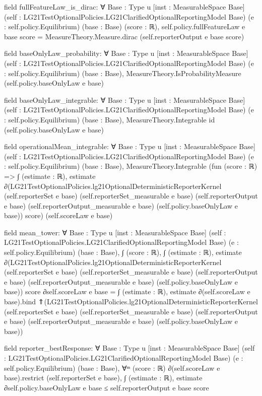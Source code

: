 \documentclass[10pt]{article}
\begin{document}
\begin{ReviewVerbatim}
field fullFeatureLaw_is_dirac:
∀ {Base : Type u} [inst : MeasurableSpace Base]
  (self : LG21TestOptionalPolicies.LG21ClarifiedOptionalReportingModel Base) (e : self.policy.Equilibrium) (base : Base)
  (score : ℝ), self.policy.fullFeatureLaw e base score = MeasureTheory.Measure.dirac (self.reporterOutput e base score)

field baseOnlyLaw_probability:
∀ {Base : Type u} [inst : MeasurableSpace Base]
  (self : LG21TestOptionalPolicies.LG21ClarifiedOptionalReportingModel Base) (e : self.policy.Equilibrium)
  (base : Base), MeasureTheory.IsProbabilityMeasure (self.policy.baseOnlyLaw e base)

field baseOnlyLaw_integrable:
∀ {Base : Type u} [inst : MeasurableSpace Base]
  (self : LG21TestOptionalPolicies.LG21ClarifiedOptionalReportingModel Base) (e : self.policy.Equilibrium)
  (base : Base), MeasureTheory.Integrable id (self.policy.baseOnlyLaw e base)

field operationalMean_integrable:
∀ {Base : Type u} [inst : MeasurableSpace Base]
  (self : LG21TestOptionalPolicies.LG21ClarifiedOptionalReportingModel Base) (e : self.policy.Equilibrium)
  (base : Base),
  MeasureTheory.Integrable
    (fun (score : ℝ) =>
      ∫ (estimate : ℝ),
        estimate ∂(LG21TestOptionalPolicies.lg21OptionalDeterministicReporterKernel (self.reporterSet e base)
            (self.reporterSet_measurable e base) (self.reporterOutput e base) (self.reporterOutput_measurable e base)
            (self.policy.baseOnlyLaw e base))
          score)
    (self.scoreLaw e base)

field mean_tower:
∀ {Base : Type u} [inst : MeasurableSpace Base]
  (self : LG21TestOptionalPolicies.LG21ClarifiedOptionalReportingModel Base) (e : self.policy.Equilibrium)
  (base : Base),
  ∫ (score : ℝ),
      ∫ (estimate : ℝ),
        estimate ∂(LG21TestOptionalPolicies.lg21OptionalDeterministicReporterKernel (self.reporterSet e base)
            (self.reporterSet_measurable e base) (self.reporterOutput e base) (self.reporterOutput_measurable e base)
            (self.policy.baseOnlyLaw e base))
          score ∂self.scoreLaw e base =
    ∫ (estimate : ℝ),
      estimate ∂(self.scoreLaw e base).bind
        ⇑(LG21TestOptionalPolicies.lg21OptionalDeterministicReporterKernel (self.reporterSet e base)
            (self.reporterSet_measurable e base) (self.reporterOutput e base) (self.reporterOutput_measurable e base)
            (self.policy.baseOnlyLaw e base))

field reporter_bestResponse:
∀ {Base : Type u} [inst : MeasurableSpace Base]
  (self : LG21TestOptionalPolicies.LG21ClarifiedOptionalReportingModel Base) (e : self.policy.Equilibrium)
  (base : Base),
  ∀ᵐ (score : ℝ) ∂(self.scoreLaw e base).restrict (self.reporterSet e base),
    ∫ (estimate : ℝ), estimate ∂self.policy.baseOnlyLaw e base ≤ self.reporterOutput e base score


\end{ReviewVerbatim}
\end{document}
